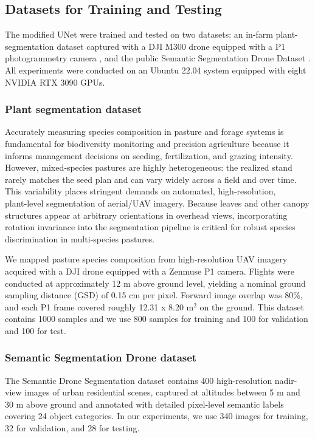 \subsection{Datasets for Training and Testing}\label{subsec:dataset}
The modified UNet were trained and tested on two datasets: an in-farm plant-segmentation dataset captured with a DJI M300 drone \cite{dji_m300} equipped with a P1 photogrammetry camera \cite{dji_p1}, and the public Semantic Segmentation Drone Dataset \cite{semantic_drone_dataset}. All experiments were conducted on an Ubuntu 22.04 system equipped with eight NVIDIA RTX 3090 GPUs.

\subsubsection{Plant segmentation dataset}\label{subsubsec:plant}
Accurately measuring species composition in pasture and forage systems is fundamental for biodiversity monitoring and precision agriculture because it informs management decisions on seeding, fertilization, and grazing intensity. However, mixed‑species pastures are highly heterogeneous: the realized stand rarely matches the seed plan and can vary widely across a field and over time. This variability places stringent demands on automated, high‑resolution, plant‑level segmentation of aerial/UAV imagery. Because leaves and other canopy structures appear at arbitrary orientations in overhead views, incorporating rotation invariance into the segmentation pipeline is critical for robust species discrimination in multi‑species pastures.

We mapped pasture species composition from high‑resolution UAV imagery acquired with a DJI drone equipped with a Zenmuse P1 camera. Flights were conducted at approximately 12 m above ground level,
yielding a nominal ground sampling distance (GSD) of {0.15} cm per pixel.
Forward image overlap was 80\%,
and each P1 frame covered roughly {12.31 x 8.20} m$^2$ on the ground.
This dataset contains 1000 samples and we use 800 samples for training and 100 for validation and 100 for test.

\subsubsection{Semantic Segmentation Drone dataset}\label{subsec:droneDataset}
The Semantic Drone Segmentation dataset contains 400 high-resolution nadir-view images of urban residential scenes, captured at altitudes between 5 m and 30 m above ground and annotated with detailed pixel-level semantic labels covering 24 object categories. In our experiments, we use 340 images for training, 32 for validation, and 28 for testing.



